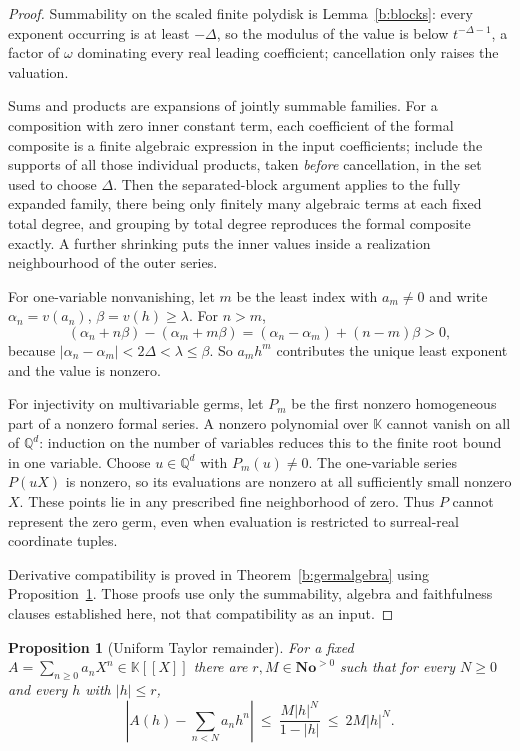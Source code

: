\documentclass[11pt,a4paper]{article}
\numberwithin{equation}{section}
\newtheorem{proposition}[theorem]{Proposition}
\theoremstyle{definition}
\theoremstyle{remark}
\theoremstyle{plain}
\newcommand{\K}{\mathbb K}
\newcommand{\No}{\mathbf{No}}
\newcommand{\tm}{t}
\newcommand{\abs}[1]{\lvert #1\rvert}
\begin{document}
\begin{proof}
Summability on the scaled finite polydisk is Lemma~\ref{b:blocks}: every
exponent occurring is at least $-\Delta$, so the modulus of the value is
below $\tm^{-\Delta-1}$, a factor of $\omega$ dominating every real
leading coefficient; cancellation only raises the valuation.

Sums and products are expansions of jointly summable families. For a
composition with zero inner constant term, each coefficient of the formal
composite is a finite algebraic expression in the input coefficients;
include the supports of all those individual products, taken \emph{before}
cancellation, in the set used to choose $\Delta$. Then the separated-block
argument applies to the fully expanded family, there being only finitely
many algebraic terms at each fixed total degree, and grouping by total
degree reproduces the formal composite exactly. A further shrinking puts
the inner values inside a realization neighbourhood of the outer series.

For one-variable nonvanishing, let $m$ be the least index with
$a_m\ne0$ and write $\alpha_n=v(a_n)$, $\beta=v(h)\ge\lambda$. For $n>m$,
\[
 (\alpha_n+n\beta)-(\alpha_m+m\beta)
 =(\alpha_n-\alpha_m)+(n-m)\beta>0 ,
\]
because $\abs{\alpha_n-\alpha_m}<2\Delta<\lambda\le\beta$. So
$a_mh^{m}$ contributes the unique least exponent and the value is nonzero.

For injectivity on multivariable germs, let $P_m$ be the first nonzero
homogeneous part of a nonzero formal series. A nonzero polynomial over
$\K$ cannot vanish on all of $\mathbb Q^d$: induction on the number of
variables reduces this to the finite root bound in one variable. Choose
$u\in\mathbb Q^d$ with $P_m(u)\ne0$. The one-variable series $P(uX)$
is nonzero, so its evaluations are nonzero at all sufficiently small
nonzero $X$. These points lie in any prescribed fine neighborhood of
zero. Thus $P$ cannot represent the zero germ, even when evaluation is
restricted to surreal-real coordinate tuples.

Derivative compatibility is proved in Theorem~\ref{b:germalgebra} using
Proposition~\ref{b:remainder}. Those proofs use only the summability,
algebra and faithfulness clauses established here, not that compatibility
as an input.
\end{proof}

\begin{proposition}[Uniform Taylor remainder]
\label{b:remainder}
For a fixed $A=\sum_{n\ge0}a_nX^{n}\in\K[[X]]$ there are
$r,M\in\No^{>0}$ such that for every $N\ge0$ and every $h$ with
$\abs h\le r$,
\[
 \left\lvert A(h)-\sum_{n<N}a_nh^{n}\right\rvert
 \ \le\ \frac{M\abs h^{N}}{1-\abs h}\ \le\ 2M\abs h^{N}.
\]
\end{proposition}
\end{document}
